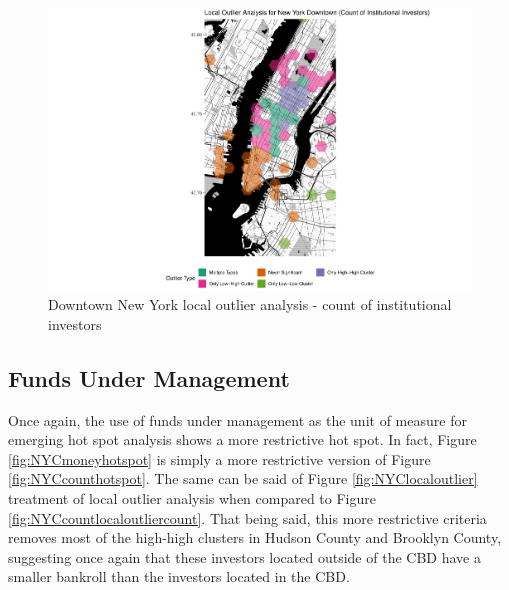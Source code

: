 \begin{figure}
	\centering
	\includegraphics[width=1\linewidth]{Figures/ChapterIV/NY_Count_LO_Downtown}
	\caption[Downtown New York Local Outlier Analysis - Count of Institutional Investors 1999-2018]{Downtown New York local outlier analysis - count of institutional investors}
	\label{fig:NYCcountlocaloutliercount_Downtown}
\end{figure}
\subsection{Funds Under Management}

Once again, the use of funds under management as the unit of measure for emerging hot spot analysis shows a more restrictive hot spot. In fact, Figure \ref{fig:NYCmoneyhotspot} is simply a more restrictive version of Figure \ref{fig:NYCcounthotspot}.  The same can be said of Figure \ref{fig:NYClocaloutlier} treatment of local outlier analysis when compared to Figure \ref{fig:NYCcountlocaloutliercount}.  That being said, this more restrictive criteria removes most of the high-high clusters in Hudson County and Brooklyn County, suggesting once again that these investors located outside of the CBD have a smaller bankroll than the investors located in the CBD.   

